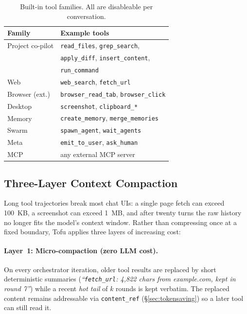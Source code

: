\documentclass[11pt]{article}
\begin{document}
\begin{table}[t]
  \centering
  \small
  \renewcommand{\arraystretch}{0.95}
  \setlength{\tabcolsep}{4pt}
  \begin{tabular}{l l}
    \toprule
    \textbf{Family} & \textbf{Example tools} \\
    \midrule
    Project co-pilot & \texttt{read\_files}, \texttt{grep\_search}, \\
                     & \texttt{apply\_diff}, \texttt{insert\_content}, \\
                     & \texttt{run\_command} \\
    Web              & \texttt{web\_search}, \texttt{fetch\_url} \\
    Browser (ext.)   & \texttt{browser\_read\_tab}, \texttt{browser\_click} \\
    Desktop          & \texttt{screenshot}, \texttt{clipboard\_*} \\
    Memory           & \texttt{create\_memory}, \texttt{merge\_memories} \\
    Swarm            & \texttt{spawn\_agent}, \texttt{wait\_agents} \\
    Meta             & \texttt{emit\_to\_user}, \texttt{ask\_human} \\
    MCP              & any external MCP server \\
    \bottomrule
  \end{tabular}
  \caption{Built-in tool families. All are disable\-able per conversation.}
  \label{tab:tools}
\end{table}

\subsection{Three-Layer Context Compaction}
\label{sec:compaction}

Long tool trajectories break most chat UIs: a single page fetch can
exceed 100~KB, a screenshot can exceed 1~MB, and after twenty turns the
raw history no longer fits the model's context window. Rather than
compressing once at a fixed boundary, Tofu applies three layers of
increasing cost:

\paragraph{Layer~1: Micro-compaction (zero LLM cost).}
On every orchestrator iteration, older tool results are replaced by short
deterministic summaries (\emph{``\texttt{fetch\_url}: 4{,}822 chars from
example.com, kept in round 7''}) while a recent \emph{hot tail} of $k$
rounds is kept verbatim. The replaced content remains addressable via
\texttt{content\_ref} (\S\ref{sec:tokensaving}) so a later tool can still
read it.
\end{document}

